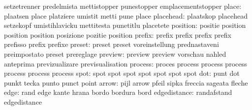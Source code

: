                            setzetrenner              predelmista
                           mettistopper              punestopper
                           emplacementstopper
                    place: plaatsen                  place
                           platziere                 umistit
                           metti                     pune
                           place
                placehead: plaatskop                 placehead
                           setzekopf                 umistihlavicku
                           mettitesta                punetitlu
                           placetete
                 position: positie                   position
                           position                  position
                           posizione                 pozitie
                           position %
                   prefix: prefix                    prefix
                           prefix                    prefix
                           prefisso                  prefix
                           prefixe
                   preset: preset                    preset
                           voreinstellung            prednastaveni
                           preimpostato              preset
                           prereglage
                  preview: preview                   preview
                           vorschau                  nahled
                           anteprima                 previzualizare
                           previsualisation
                  process: proces                    process
                           process                   process
                           process                   process
                           process
                     spot: spot                      spot
                           spot                      spot
                           spot                      spot
                           spot
                      dot: punt                      dot
                           punkt                     tecka
                           punto                     punct
                           point
                    arrow: pijl                      arrow
                           pfeil                     sipka
                           freccia                   sageata
                           fleche
                     edge: rand                      edge
                           kante                     hrana
                           bordo                     bordura
                           bord
             edgedistance: randafstand               edgedistance
